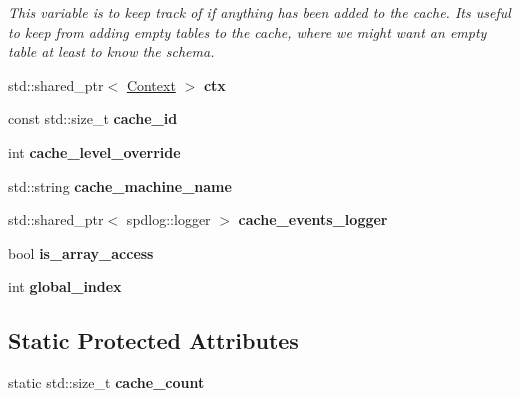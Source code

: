 \begin{DoxyCompactItemize}
\begin{DoxyCompactList}\small\item\em This variable is to keep track of if anything has been added to the cache. Its useful to keep from adding empty tables to the cache, where we might want an empty table at least to know the schema. \end{DoxyCompactList}\item 
\mbox{\label{classral_1_1cache_1_1CacheMachine_a884aaed8d12b70a622b5364874e4e717}} 
std\+::shared\+\_\+ptr$<$ \hyperlink{classblazingdb_1_1manager_1_1Context}{Context} $>$ {\bfseries ctx}
\item 
\mbox{\label{classral_1_1cache_1_1CacheMachine_a0104264db65ee96007b0d5ff140d1289}} 
const std\+::size\+\_\+t {\bfseries cache\+\_\+id}
\item 
\mbox{\label{classral_1_1cache_1_1CacheMachine_a5c1b32734a27db228124277e5424881d}} 
int {\bfseries cache\+\_\+level\+\_\+override}
\item 
\mbox{\label{classral_1_1cache_1_1CacheMachine_a1cffc314fb1231b57b0b023ea63bb6ac}} 
std\+::string {\bfseries cache\+\_\+machine\+\_\+name}
\item 
\mbox{\label{classral_1_1cache_1_1CacheMachine_a73aa8703216e8cfef44223771303699c}} 
std\+::shared\+\_\+ptr$<$ spdlog\+::logger $>$ {\bfseries cache\+\_\+events\+\_\+logger}
\item 
\mbox{\label{classral_1_1cache_1_1CacheMachine_a691709ed03b9c3cd64dfb49add9a8ee6}} 
bool {\bfseries is\+\_\+array\+\_\+access}
\item 
\mbox{\label{classral_1_1cache_1_1CacheMachine_af469fe34b376e2daeca01385e0a9c765}} 
int {\bfseries global\+\_\+index}
\end{DoxyCompactItemize}
\subsection*{Static Protected Attributes}
\begin{DoxyCompactItemize}
\item 
\mbox{\label{classral_1_1cache_1_1CacheMachine_ac21e493ee5d04706d92bde2ac4946260}} 
static std\+::size\+\_\+t {\bfseries cache\+\_\+count}
\end{DoxyCompactItemize}



